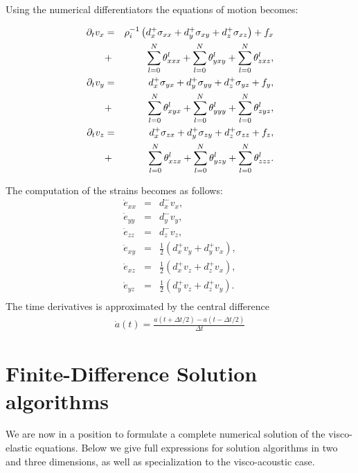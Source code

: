 \documentclass[11pt]{article}
\begin{document}
Using the numerical differentiators the equations of motion becomes:

\begin{eqnarray}
  \partial_t{v}_x & = & \rho^{-1}_i\left(d^+_x \sigma_{xx} +d^+_y \sigma_{xy} 
                                 +d^+_z \sigma_{xz}\right) + f_x \\
           & + & \sum_{l=0}^N\theta^l_{xxx} +  \sum_{l=0}^N\theta^l_{yxy} +  
                                   \sum_{l=0}^N\theta^l_{zxz}, \\ 
  \partial_t{v}_y & = & d^+_x \sigma_{yx} +d^+_y \sigma_{yy} +d^+_z \sigma_{yz} + f_y, \\
           & + & \sum_{l=0}^N\theta^l_{xyx} +  
                           \sum_{l=0}^N\theta^l_{yyy} 
                        +  \sum_{l=0}^N\theta^l_{zyz}, \\ 
  \partial_t{v}_z & = & d^+_x \sigma_{zx} +d^+_y \sigma_{zy} 
                        +d^+_z \sigma_{zz} + f_z, \\
           & + & \sum_{l=0}^N\theta^l_{xzx} 
             +  \sum_{l=0}^N\theta^l_{yzy} +  \sum_{l=0}^N\theta^l_{zzz}.
\end{eqnarray}

The computation of the strains becomes as follows:
\begin{eqnarray}
    \dot{e}_{xx} & = & d^-_x v_x, \nonumber \\
    \dot{e}_{yy} & = & d^-_y v_y, \nonumber \\
    \dot{e}_{zz} & = & d^-_z v_z, \nonumber \\
    \dot{e}_{xy} & = & \frac{1}{2}(d^+_x v_y + d^+_y v_x),\nonumber\\
    \dot{e}_{xz} & = & \frac{1}{2}(d^+_x v_z + d^+_z v_x),\nonumber\\
    \dot{e}_{yz} & = & \frac{1}{2}(d^+_y v_z +d^+_z v_y).\nonumber\\
                \label{eq:strains}
\end{eqnarray}
The time derivatives is approximated by the central difference
\begin{eqnarray}
\dot{a}(t) = \frac{a(t+\Delta t/2) - a(t-\Delta t/2)}{\Delta t}
                      \label{eq:time-derivative}
\end{eqnarray}

\section{Finite-Difference Solution algorithms}
We are now in a position to formulate a complete numerical 
solution of the visco-elastic equations.
Below we give full expressions for
solution algorithms in two and three dimensions, as well
as specialization to the visco-acoustic case.
\end{document}
